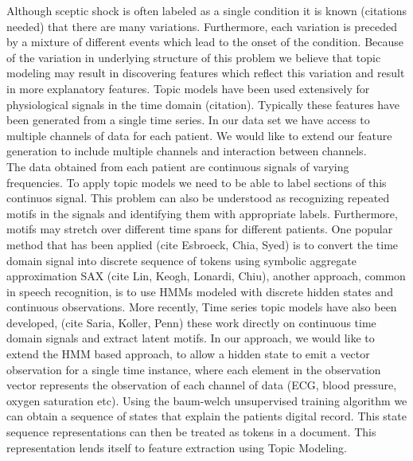 \documentclass[dvips,12pt]{article}
\begin{document}
Although sceptic shock is often labeled as a single condition it is known (citations needed) that there are many variations. 
Furthermore, each variation is preceded by a mixture of different events which lead to the onset of the condition. Because of the variation in underlying structure
of this problem we believe that topic modeling may result in discovering features which reflect this variation and result in more explanatory features. Topic models have been used extensively for physiological signals in the time domain (citation). Typically these features have been generated from a single time series. In our data set we have access to multiple channels of data for each patient. We would like to extend our feature generation to include multiple channels and interaction between channels. \\
The data obtained from each patient are continuous signals of varying frequencies. To apply topic models we need to be able to label sections of this continuos signal. This problem can also be understood as recognizing repeated motifs in the signals and identifying them with appropriate labels. Furthermore, motifs may stretch over different time spans for different patients. One popular method that has been applied (cite Esbroeck, Chia, Syed) is to convert the time domain signal into discrete sequence of tokens using symbolic aggregate approximation SAX (cite Lin, Keogh, Lonardi, Chiu), another approach, common in speech recognition, is to use HMMs modeled with discrete hidden states and continuous observations. More recently, Time series topic models have also been developed, (cite Saria, Koller, Penn) these work directly on continuous time domain signals and extract latent motifs. In our approach, we would like to extend the HMM based approach, to allow a hidden state to emit a vector observation for a single time instance, where each element in the observation vector represents the observation of each channel of data (ECG, blood pressure, oxygen saturation etc). Using the baum-welch unsupervised training algorithm we can obtain a sequence of states that explain the patients digital record. This state sequence representations can then be treated as tokens in a document. This representation lends itself to feature extraction using Topic Modeling. 
\end{document}
